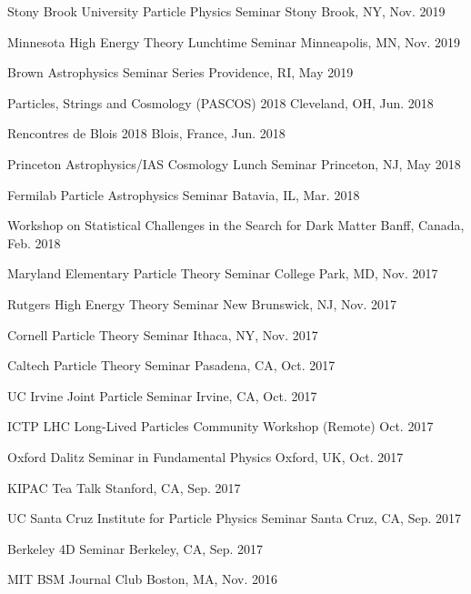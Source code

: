 \documentclass[letterpaper,11pt]{article}
\newenvironment{packed_itemize}{
\begin{itemize}[label=\raisebox{0.25ex}{\tiny$\bullet$}, topsep=0pt, partopsep=0pt]
  \setlength{\itemsep}{4.0pt}
  \setlength{\parskip}{0pt}
  \setlength{\parsep}{0pt}}{\end{itemize}
}
\begin{document}
\begin{packed_itemize}
  \item Stony Brook University Particle Physics Seminar \hfill Stony Brook, NY, Nov. 2019
  \item Minnesota High Energy Theory Lunchtime Seminar \hfill  Minneapolis, MN, Nov. 2019
  \item Brown Astrophysics Seminar Series \hfill Providence, RI, May 2019
  \item Particles, Strings and Cosmology (PASCOS) 2018 \hfill Cleveland, OH, Jun. 2018
  \item Rencontres de Blois 2018 \hfill Blois, France, Jun. 2018
  \item Princeton Astrophysics/IAS Cosmology Lunch Seminar \hfill Princeton, NJ, May 2018
  \item Fermilab Particle Astrophysics Seminar \hfill Batavia, IL, Mar. 2018
  \item Workshop on Statistical Challenges in the Search for Dark Matter \hfill Banff, Canada, Feb. 2018
  \item Maryland Elementary Particle Theory Seminar \hfill College Park, MD, Nov. 2017
  \item Rutgers High Energy Theory Seminar \hfill New Brunswick, NJ, Nov. 2017
  \item Cornell Particle Theory Seminar \hfill Ithaca, NY, Nov. 2017
  \item Caltech Particle Theory Seminar \hfill Pasadena, CA, Oct. 2017
  \item UC Irvine Joint Particle Seminar \hfill Irvine, CA, Oct. 2017
  \item ICTP LHC Long-Lived Particles Community Workshop (Remote) \hfill Oct. 2017
  \item Oxford Dalitz Seminar in Fundamental Physics  \hfill Oxford, UK, Oct. 2017
  \item KIPAC Tea Talk  \hfill Stanford, CA, Sep. 2017
  \item UC Santa Cruz Institute for Particle Physics Seminar  \hfill Santa Cruz, CA, Sep. 2017
  \item Berkeley 4D Seminar  \hfill Berkeley, CA, Sep. 2017
  \item MIT BSM Journal Club \hfill Boston, MA, Nov. 2016
\end{packed_itemize}

\vspace{2mm}
\end{document}
